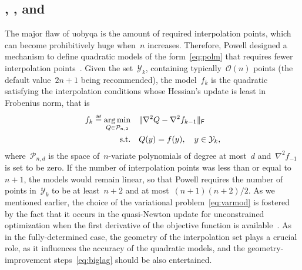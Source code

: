 \documentclass[11pt,draft]{article}
\numberwithin{equation}{section}
\DeclareMathOperator*\argmin{arg\,min}
\def\defeq{\ensuremath{\mathrel{\stackrel{\text{\tiny\textsf{def}}}{=}}}}
\newcommand\norm[2][]{#1\|#2#1\|}
\def\obj{\ensuremath{f}}
\newcommand\objmdl[1][k]{\obj_{#1}}
\newcommand\itpls[1][k]{\mathcal{Y}_{#1}}
\begin{document}
\subsection{\texorpdfstring{}{NEWUOA}, \texorpdfstring{}{BOBYQA}, and~\texorpdfstring{}{LINCOA}}

The major flaw of \gls{uobyqa} is the amount of required interpolation points, which can become prohibitively huge when~$n$ increases.
Therefore, Powell designed a mechanism to define quadratic models of the form~\cref{eq:polm} that requires fewer interpolation points~\cite{Powell_2004a}.
Given the set~$\itpls$, containing typically~$\mathcal{O}(n)$ points (the default value~$2n + 1$ being recommended), the model~$\objmdl$ is the quadratic satisfying the interpolation conditions whose Hessian's update is least in Frobenius norm, that is
\begin{equation}
    \label{eq:varmod}
    \begin{aligned}
        \objmdl \defeq \argmin_{Q \in \mathcal{P}_{n, 2}}   & \quad \norm{\nabla^2 Q - \nabla^2 \objmdl[k - 1]}_{\mathsf{F}}\\
        \text{s.t.}                                         & \quad Q(y) = \obj(y), \quad y \in \itpls,
    \end{aligned}
\end{equation}
where~$\mathcal{P}_{n, d}$ is the space of~$n$-variate polynomials of degree at most~$d$ and~$\nabla^2 \objmdl[-1]$ is set to be zero.
If the number of interpolation points was less than or equal to~$n + 1$, the models would remain linear, so that Powell requires the number of points in~$\itpls$ to be at least~$n + 2$ and at most~$(n + 1)(n + 2) / 2$.
As we mentioned earlier, the choice of the variational problem~\cref{eq:varmod} is fostered by the fact that it occurs in the quasi-Newton update for unconstrained optimization when the first derivative of the objective function is available~\cite[\S 3.6]{Fletcher_1987}.
As in the fully-determined case, the geometry of the interpolation set plays a crucial role, as it influences the accuracy of the quadratic models, and the geometry-improvement steps~\cref{eq:biglag} should be also entertained.
\end{document}
